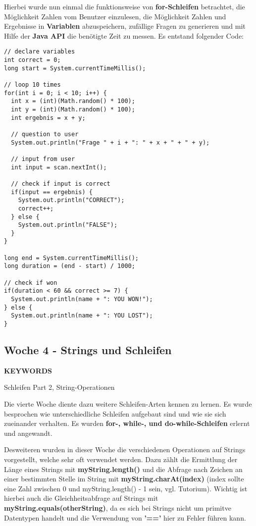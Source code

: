 Hierbei wurde nun einmal die funktionsweise von \textbf{for-Schleifen} betrachtet, die Möglichkeit Zahlen vom Benutzer einzulesen, die Möglichkeit Zahlen und Ergebnisse in \textbf{Variablen} abzuspeichern, zufällige Fragen zu generieren und mit Hilfe der \textbf{Java API} die benötigte Zeit zu messen. Es entstand folgender Code:

\begin{verbatim}
// declare variables
int correct = 0;
long start = System.currentTimeMillis();

// loop 10 times
for(int i = 0; i < 10; i++) {
  int x = (int)(Math.random() * 100);
  int y = (int)(Math.random() * 100);
  int ergebnis = x + y;

  // question to user
  System.out.println("Frage " + i + ": " + x + " + " + y);

  // input from user
  int input = scan.nextInt();

  // check if input is correct
  if(input == ergebnis) {
    System.out.println("CORRECT");
    correct++;
  } else {
    System.out.println("FALSE");
  }
}

long end = System.currentTimeMillis();
long duration = (end - start) / 1000;

// check if won
if(duration < 60 && correct >= 7) {
  System.out.println(name + ": YOU WON!");
} else {
  System.out.println(name + ": YOU LOST");
}
\end{verbatim}
\subsection{Woche 4 - Strings und Schleifen}
\label{ch:weekfour}
\line
\begin{center}
	\textbf{KEYWORDS}
	
	Schleifen Part 2, String-Operationen 
\end{center}
\line
Die vierte Woche diente dazu weitere Schleifen-Arten kennen zu lernen. Es wurde besprochen wie unterschiedliche Schleifen aufgebaut sind und wie sie sich zueinander verhalten. Es wurden \textbf{for-, while-, und do-while-Schleifen} erlernt und angewandt. 

Desweiteren wurden in dieser Woche die verschiedenen Operationen auf Strings vorgestellt, welche sehr oft verwendet werden. Dazu zählt die Ermittlung der Länge eines Strings mit \textbf{myString.length()} und die Abfrage nach Zeichen an einer bestimmten Stelle im String mit \textbf{myString.charAt(index)} (index sollte eine Zahl zwischen 0 und myString.length() - 1 sein, vgl. Tutorium). Wichtig ist hierbei auch die Gleichheitsabfrage auf Strings mit \textbf{myString.equals(otherString)}, da es sich bei Strings nicht um primitve Datentypen handelt und die Verwendung von \textbf{'=='} hier zu Fehler führen kann.

